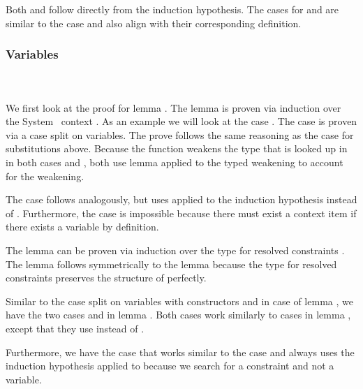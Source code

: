 \noindent Both  and  follow directly from the induction hypothesis. 
The cases for  and  are similar to the case  and also align with their corresponding definition.

\subsubsection{Variables}\hfill\\\\
We first look at the proof for lemma . 
The lemma is proven via induction over the System \Fo\ context . 
\DPTVarPresLookup
As an example we will look at the case   . The case is proven via a case split on variables. 
The prove follows the same reasoning as the  case for substitutions above. 
Because the function  weakens the type  that is looked up in  in both cases  and , both use lemma  applied to the typed weakening  to account for the weakening. 

\noindent The case    follows analogously, but uses  applied to the induction hypothesis instead of . Furthermore, the case  is impossible because there must exist a context item if there exists a variable by definition.

\noindent The lemma  can be proven via induction over the type for resolved constraints \Data{[}  \Data{]∈} . The lemma follows symmetrically to the lemma  because the type for resolved constraints preserves the structure of  perfectly.

\DPTOVarPresLookup
Similar to the case split on variables with constructors  and  in case    of lemma , we have the two cases  and  in lemma . Both cases work similarly to cases in lemma , except that they use  instead of .

\noindent Furthermore, we have the case  that works similar to the case    and always uses the induction hypothesis applied to  because we search for a constraint and not a variable.